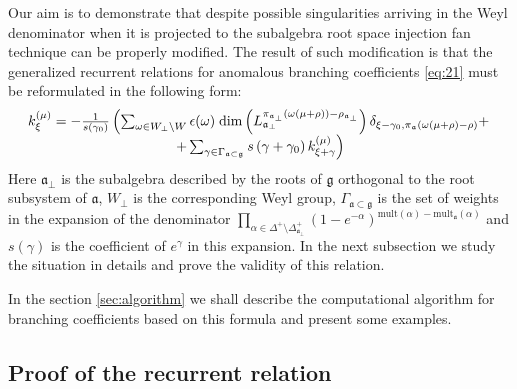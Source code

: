 \documentclass[a4paper,12pt]{article}
\theoremstyle{definition} \newtheorem{Def}{Definition}
\begin{document}
Our aim is to demonstrate that despite possible singularities arriving in the Weyl denominator
when it is projected to the subalgebra root space injection fan technique can be properly modified.
The result of such modification is that the generalized recurrent relations for anomalous branching
coefficients \eqref{eq:21} must be reformulated in the following form:
\begin{equation}
  \label{eq:1}
  \begin{array}{c}
      k_{\xi }^{\left( \mu \right) }=-\frac{1}{s\left( \gamma _{0}\right) }\left(
  \sum_{\omega\in W_{\bot}\backslash W} \epsilon(\omega)\; {\rm dim}\left(L^{\pi_{\mathfrak{a}_{\bot}}(\omega(\mu+\rho))-\rho_{\mathfrak{a}_{\bot}}}_{\mathfrak{a}_{\bot}}\right) \delta_{\xi-\gamma_0,\pi_{\mathfrak{a}}(\omega(\mu+\rho)-\rho)}+ \right.\\
\left.
+\sum_{\gamma \in
\Gamma _{\frak{a}\subset \frak{g}}}s\left( \gamma +\gamma _{0}\right) k_{\xi
+\gamma }^{\left( \mu \right) }\right)
  \end{array}
   \end{equation}
Here $\mathfrak{a}_{\bot}$ is the subalgebra described by the roots of $\mathfrak{g}$
orthogonal to the root subsystem of $\mathfrak{a}$, $W_{\bot}$ is the corresponding Weyl group,
$\Gamma_{\mathfrak{a}\subset \mathfrak{g}}$ is the set of weights in the expansion
of the denominator $\prod_{\alpha\in \Delta^{+}\setminus \Delta^{+}_{\mathfrak{a}_{\bot}}}
(1-e^{-\alpha})^{\mathrm{mult}(\alpha)-\mathrm{mult}_{\mathfrak{a}}(\alpha)}$ and $s(\gamma)$
is the coefficient of $e^{\gamma}$ in this expansion.
In the next subsection we study the situation in details and prove the validity of this relation.

In the section \ref{sec:algorithm} we  shall describe the  computational algorithm for  branching coefficients
based on this formula and present some examples.

\subsection{Proof of the recurrent relation}
\label{sec:proof}
\end{document}
